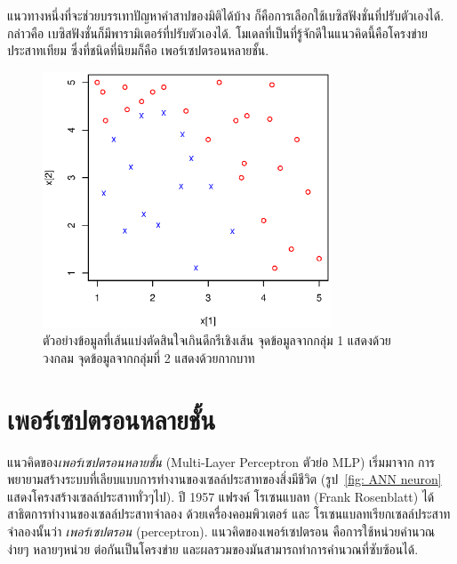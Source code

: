 แนวทางหนึ่งที่จะช่วยบรรเทาปัญหาคำสาปของมิติได้บ้าง ก็คือการเลือกใช้เบซิสฟังชั่นที่ปรับตัวเองได้.
กล่าวคือ เบซิสฟังชั่นก็มีพารามิเตอร์ที่ปรับตัวเองได้.
โมเดลที่เป็นที่รู้จักดีในแนวคิดนี้คือโครงข่ายประสาทเทียม ซึ่งที่ชนิดที่นิยมก็คือ เพอร์เซปตรอนหลายชั้น.


%
\begin{figure}
\begin{center}
\includegraphics[height=3in]{04ANN/quadraticDecisionBound.eps}
\end{center}
\caption{ตัวอย่างข้อมูลที่เส้นแบ่งตัดสินใจเกินดีกรีเชิงเส้น 
จุดข้อมูลจากกลุ่ม 1 แสดงด้วยวงกลม 
จุดข้อมูลจากกลุ่มที่ 2 แสดงด้วยกากบาท}
\label{fig: ANN nonlinear decision boundary}
\end{figure}
%

\section{เพอร์เซปตรอนหลายชั้น}
\label{sec: Multilayer Perceptron}

แนวคิดของ\textit{เพอร์เซปตรอนหลายชั้น} (Multi-Layer Perceptron ตัวย่อ MLP) เริ่มมาจาก การพยายามสร้างระบบที่เลียบแบบการทำงานของเซลล์ประสาทของสิ่งมีชีวิต 
(รูป~\ref{fig: ANN neuron} แสดงโครงสร้างเซลล์ประสาททั่วๆไป).
%
ปี 1957 แฟรงค์ โรเซนแบลท (Frank Rosenblatt) ได้สาธิตการทำงานของเซลล์ประสาทจำลอง  ด้วยเครื่องคอมพิวเตอร์
และ โรเซนแบลทเรียกเซลล์ประสาทจำลองนั้นว่า \textit{เพอร์เซปตรอน} (perceptron).
แนวคิดของเพอร์เซปตรอน คือการใช้หน่วยคำนวณง่ายๆ หลายๆหน่วย ต่อกันเป็นโครงข่าย และผลรวมของมันสามารถทำการคำนวณที่ซับซ้อนได้.

